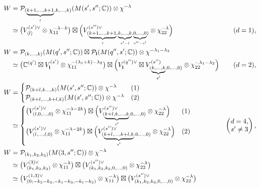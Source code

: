 \documentclass[pdftex]{sigma}
\numberwithin{equation}{section}
\newcommand{\bl}{\mathbf{l}}
\newcommand{\BC}{\mathbb{C}}
\newcommand{\cP}{\mathcal{P}}
\begin{document}
\begin{align*}
W&=\cP_{(\underbrace{\scriptstyle k+1,\ldots,k+1}_l,k,\ldots,k)}(M(s',s'';\BC))\otimes\chi^{-\lambda} \\
&\simeq \big(V_{\langle l\rangle}^{(s')\vee}\otimes\chi_{11}^{-\lambda-k}\big)
\boxtimes \Bigl(V_{(\underbrace{\scriptstyle k+1,\ldots,k+1}_l,\underbrace{\scriptstyle k,\ldots,k}_{s'-l},
\underbrace{\scriptstyle 0,\ldots,0}_{s''-s'})}^{(s'')\vee}
\otimes\chi_{22}^{-\lambda}\Bigr) & (d=1), \\
W&=\cP_{(k,\ldots,k)}(M(q',s'';\BC))\boxtimes\cP_\bl(M(q'',s';\BC))\otimes\chi^{-\lambda_1-\lambda_2} \\
&\simeq \big(\BC^{(q')}\boxtimes V_\bl^{(s')}\otimes\chi_{11}^{-(\lambda_1+k)-\lambda_2}\big)\boxtimes
\Bigl(V_\bl^{(q'')\vee}\boxtimes V_{(\underbrace{\scriptstyle k,\ldots,k}_{q'},0,\ldots,0)}^{(s'')}\otimes\chi_{22}^{-\lambda_1-\lambda_2}\Bigr)
& (d=2), \\
W&=\begin{cases}\cP_{(k+l,k\ldots,k)}(M(s',s'';\BC))\otimes\chi^{-\lambda} & (1) \\
\cP_{(k+l,\ldots,k+l,k)}(M(s',s'';\BC))\otimes\chi^{-\lambda} & (2) \end{cases} \\
&\simeq\begin{cases}\big(V_{(l,0,\ldots,0)}^{(s')\vee}\otimes\chi_{11}^{-\lambda-2k}\big)
\boxtimes \Bigl(V_{(\underbrace{\scriptstyle k+l,k,\ldots,k}_{s'},0,\ldots,0)}^{(s'')\vee}
\otimes\chi_{22}^{-\lambda}\Bigr) & (1) \\
\big(V_{(l,\ldots,l,0)}^{(s')\vee}\otimes\chi_{11}^{-\lambda-2k}\big)
\boxtimes \Bigl(V_{(\underbrace{\scriptstyle k+l,\ldots,k+l,k}_{s'},0,\ldots,0)}^{(s'')\vee}
\otimes\chi_{22}^{-\lambda}\Bigr) & (2) \end{cases} & \begin{pmatrix}d=4,\\ s'\ne 3\end{pmatrix}, \\
W&=\cP_{(k_1,k_2,k_3)}(M(3,s'';\BC))\otimes\chi^{-\lambda} \\
&\simeq\big(V_{(k_1,k_2,k_3)}^{(3)\vee}\otimes\chi_{11}^{-\lambda}\big)
\boxtimes \big(V_{(k_1,k_2,k_3,0,\ldots,0)}^{(s'')\vee}\otimes\chi_{22}^{-\lambda}\big) \hspace{-30pt}\\
&\simeq\big(V_{(0;-k_2-k_3,-k_1-k_3,-k_1-k_2)}^{(1,3)\vee}\otimes\chi_{11}^{-\lambda}\big)
\boxtimes \big(V_{(k_1,k_2,k_3,0,\ldots,0)}^{(s'')\vee}\otimes\chi_{22}^{-\lambda}\big)

\end{align*}
\end{document}
